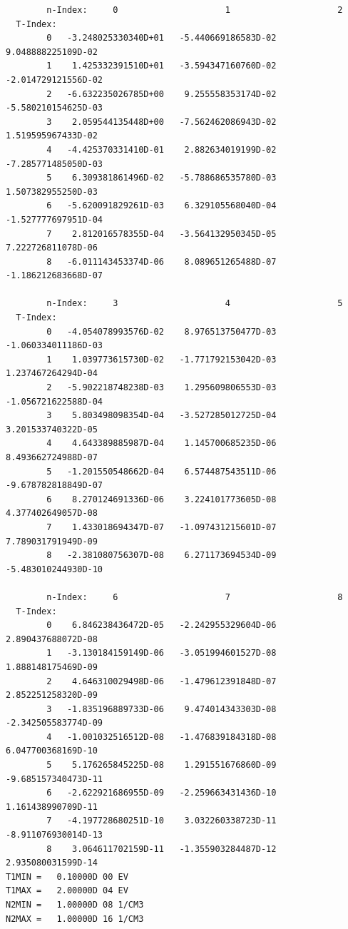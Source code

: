 \documentclass[amsmath,amssymb,a4]{revtex4-2}
\begin{document}
\begin{small}\begin{verbatim}
        n-Index:     0                     1                     2
  T-Index:
        0   -3.248025330340D+01   -5.440669186583D-02    9.048888225109D-02
        1    1.425332391510D+01   -3.594347160760D-02   -2.014729121556D-02
        2   -6.632235026785D+00    9.255558353174D-02   -5.580210154625D-03
        3    2.059544135448D+00   -7.562462086943D-02    1.519595967433D-02
        4   -4.425370331410D-01    2.882634019199D-02   -7.285771485050D-03
        5    6.309381861496D-02   -5.788686535780D-03    1.507382955250D-03
        6   -5.620091829261D-03    6.329105568040D-04   -1.527777697951D-04
        7    2.812016578355D-04   -3.564132950345D-05    7.222726811078D-06
        8   -6.011143453374D-06    8.089651265488D-07   -1.186212683668D-07

        n-Index:     3                     4                     5
  T-Index:
        0   -4.054078993576D-02    8.976513750477D-03   -1.060334011186D-03
        1    1.039773615730D-02   -1.771792153042D-03    1.237467264294D-04
        2   -5.902218748238D-03    1.295609806553D-03   -1.056721622588D-04
        3    5.803498098354D-04   -3.527285012725D-04    3.201533740322D-05
        4    4.643389885987D-04    1.145700685235D-06    8.493662724988D-07
        5   -1.201550548662D-04    6.574487543511D-06   -9.678782818849D-07
        6    8.270124691336D-06    3.224101773605D-08    4.377402649057D-08
        7    1.433018694347D-07   -1.097431215601D-07    7.789031791949D-09
        8   -2.381080756307D-08    6.271173694534D-09   -5.483010244930D-10

        n-Index:     6                     7                     8
  T-Index:
        0    6.846238436472D-05   -2.242955329604D-06    2.890437688072D-08
        1   -3.130184159149D-06   -3.051994601527D-08    1.888148175469D-09
        2    4.646310029498D-06   -1.479612391848D-07    2.852251258320D-09
        3   -1.835196889733D-06    9.474014343303D-08   -2.342505583774D-09
        4   -1.001032516512D-08   -1.476839184318D-08    6.047700368169D-10
        5    5.176265845225D-08    1.291551676860D-09   -9.685157340473D-11
        6   -2.622921686955D-09   -2.259663431436D-10    1.161438990709D-11
        7   -4.197728680251D-10    3.032260338723D-11   -8.911076930014D-13
        8    3.064611702159D-11   -1.355903284487D-12    2.935080031599D-14
T1MIN =   0.10000D 00 EV
T1MAX =   2.00000D 04 EV
N2MIN =   1.00000D 08 1/CM3
N2MAX =   1.00000D 16 1/CM3
\end{verbatim}\end{small}
\end{document}
